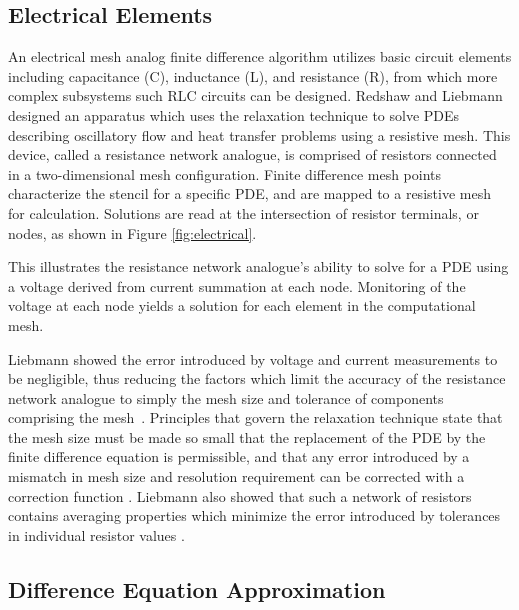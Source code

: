 \subsection{Electrical Elements}

An electrical mesh analog finite difference algorithm utilizes basic circuit elements including capacitance (C), inductance (L), and resistance (R), from which more complex subsystems such RLC circuits can be designed. Redshaw and Liebmann designed an apparatus which uses the relaxation technique to solve PDEs describing oscillatory flow \cite{P.Palmer_1959} and heat transfer problems \cite{G.Liebmann_1950} using a resistive mesh.  This device, called a resistance network analogue, is comprised of resistors connected in a two-dimensional mesh configuration.  Finite difference mesh points characterize the stencil for a specific PDE, and are mapped to a resistive mesh for calculation.  Solutions are read at the intersection of resistor terminals, or nodes, as shown in Figure \ref{fig:electrical}.

\par This illustrates the resistance network analogue's ability to solve for a PDE using a voltage derived from current summation at each node.  Monitoring of the voltage at each node yields a solution for each element in the computational mesh.

\par Liebmann showed the error introduced by voltage and current measurements to be negligible, thus reducing the factors which limit the accuracy of the resistance network analogue to simply the mesh size and tolerance of components comprising the mesh~\cite{G.Liebmann_1950}.  Principles that govern the relaxation technique state that the mesh size must be made so small that the replacement of the PDE by the finite difference equation is permissible, and that any error introduced by a mismatch in mesh size and resolution requirement can be corrected with a correction function \cite{G.Liebmann_1950}.  Liebmann also showed that such a network of resistors contains averaging properties which minimize the error introduced by tolerances in individual resistor values \cite{G.Liebmann_1950}.

\subsection{Difference Equation Approximation}

